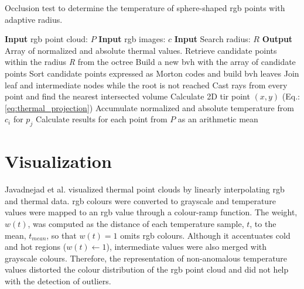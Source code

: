\begin{algorithm}[hbt]
    \small
	\caption{Occlusion test to determine the temperature of sphere-shaped \acrshort{rgb} points with adaptive radius.}
	\label{alg:occlusion_test}
	\begin{algorithmic}[1]
    	\State \textbf{Input} \acrshort{rgb} point cloud: $P$ %
    	\State \textbf{Input} \acrshort{rgb} images: $c$ %
    	\State \textbf{Input} Search radius: $R$ %
        \State \textbf{Output} Array of normalized and absolute thermal values. %
		    \State Retrieve candidate points within the radius \textit{R} from the octree
		    \State Build a new \acrshort{bvh} with the array of candidate points %
		        \State Sort candidate points expressed as Morton codes and build \acrshort{bvh} leaves %
		        \State Join leaf and intermediate nodes while the root is not reached %
		    \EndProcedure
		        \State Cast rays from every point and find the nearest intersected volume %
		            \State Calculate 2D \acrshort{tir} point $(x, y)$ (Eq.: \ref{eq:thermal_projection}) %
		                \State Accumulate normalized and absolute temperature from $c_i$ for $p_j$ %
	    	        \EndIf
	    	    \EndIf
		    \EndFor
		\EndFor
		\State Calculate results for each point from $P$ as an arithmetic mean %
	\end{algorithmic}
    \normalsize
\end{algorithm} 

\section{Visualization}

Javadnejad et al. \cite{javadnejad_photogrammetric_2020} visualized thermal point clouds by linearly interpolating \acrshort{rgb} and thermal data. \acrshort{rgb} colours were converted to grayscale and temperature values were mapped to an \acrshort{rgb} value through a colour-ramp function. The weight, $w(t)$, was computed as the distance of each temperature sample, $t$, to the mean, $t_{\textit{mean}}$, so that $w(t) = 1$ omits \acrshort{rgb} colours. Although it accentuates cold and hot regions ($w(t) \gets 1$), intermediate values were also merged with grayscale colours. Therefore, the representation of non-anomalous temperature values distorted the colour distribution of the \acrshort{rgb} point cloud and did not help with the detection of outliers.

